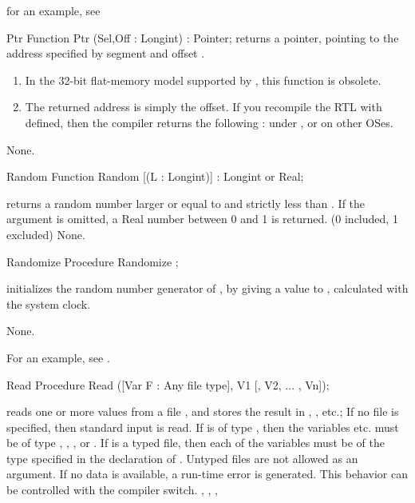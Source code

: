 \documentclass{report}
\begin{document}
for an example, see 

\begin{function}{Ptr}
\Declaration
Function Ptr (Sel,Off : Longint) : Pointer;
\Description
{} returns a pointer, pointing to the address specified by
segment  and offset .

 \begin{remark} 
\begin{enumerate}
\item In the 32-bit flat-memory model supported by \fpc, this
function is obsolete.
\item The returned address is simply the offset. If you recompile
the RTL with  defined, then the compiler returns the
following :  under \dos, or
 on other OSes.
\end{enumerate}
\end{remark}
\Errors
None.
\SeeAlso
{}
\end{function}


\begin{function}{Random}
\Declaration
Function Random [(L : Longint)] : Longint or Real;

\Description
{} returns a random number larger or equal to  and
strictly less than .
If the argument  is omitted, a Real number between 0 and 1 is returned.
(0 included, 1 excluded)
\Errors
None.
\SeeAlso
{}
\end{function}


\begin{procedure}{Randomize}
\Declaration
Procedure Randomize ;

\Description
{} initializes the random number generator of \fpc, by giving
a value to , calculated with the system clock.

\Errors
None.
\SeeAlso
{}
\end{procedure}
For an example, see .
\begin{procedure}{Read}
\Declaration
Procedure Read ([Var F : Any file type], V1 [, V2, ... , Vn]);

\Description
{} reads one or more values from a file , and stores the
result in , , etc.; If no file  is specified, then
standard input is read.
If  is of type , then the variables  etc. must be
of type , , ,  or .
If  is a typed file, then each of the variables must be of the type
specified in the declaration of . Untyped files are not allowed as an
argument.
\Errors
If no data is available, a run-time error is generated. This behavior can
be controlled with the  compiler switch.
\SeeAlso
{}, , , 
\end{procedure}
\end{document}
